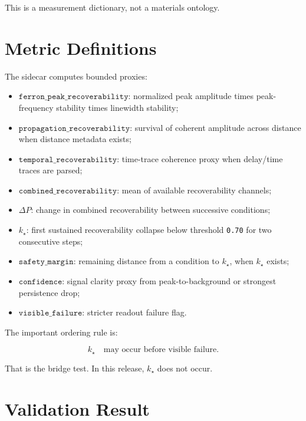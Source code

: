 \documentclass[11pt]{article}
\begin{document}
This is a measurement dictionary, not a materials ontology.

\section{Metric Definitions}

The sidecar computes bounded proxies:

\begin{itemize}
\item \(\texttt{ferron\_peak\_recoverability}\): normalized peak amplitude times peak-frequency stability times linewidth stability;
\item \(\texttt{propagation\_recoverability}\): survival of coherent amplitude across distance when distance metadata exists;
\item \(\texttt{temporal\_recoverability}\): time-trace coherence proxy when delay/time traces are parsed;
\item \(\texttt{combined\_recoverability}\): mean of available recoverability channels;
\item \(\Delta P\): change in combined recoverability between successive conditions;
\item \(k_\star\): first sustained recoverability collapse below threshold \texttt{0.70} for two consecutive steps;
\item \(\texttt{safety\_margin}\): remaining distance from a condition to \(k_\star\), when \(k_\star\) exists;
\item \(\texttt{confidence}\): signal clarity proxy from peak-to-background or strongest persistence drop;
\item \(\texttt{visible\_failure}\): stricter readout failure flag.
\end{itemize}

The important ordering rule is:

\[
k_\star \quad \text{may occur before visible failure.}
\]

That is the bridge test. In this release, \(k_\star\) does not occur.

\section{Validation Result}
\end{document}
